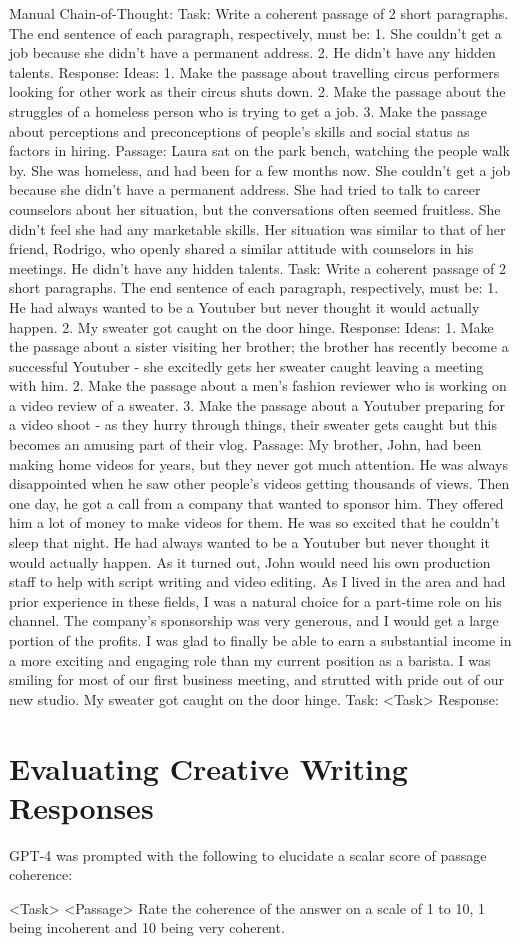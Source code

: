 \documentclass[11pt]{article}
\begin{document}
Manual Chain-of-Thought:
Task: Write a coherent passage of 2 short paragraphs. The end sentence of each paragraph, respectively, must be: 1. She couldn't get a job because she didn't have a permanent address. 2. He didn't have any hidden talents.
Response: 
Ideas:
1. Make the passage about travelling circus performers looking for other work as their circus shuts down.
2. Make the passage about the struggles of a homeless person who is trying to get a job. 
3. Make the passage about perceptions and preconceptions of people's skills and social status as factors in hiring.
Passage: 
Laura sat on the park bench, watching the people walk by. She was homeless, and had been for a few months now. She couldn't get a job because she didn't have a permanent address.
She had tried to talk to career counselors about her situation, but the conversations often seemed fruitless. She didn't feel she had any marketable skills. Her situation was similar to that of her friend, Rodrigo, who openly shared a similar attitude with counselors in his meetings. He didn't have any hidden talents.
Task: Write a coherent passage of 2 short paragraphs. The end sentence of each paragraph, respectively, must be: 1. He had always wanted to be a Youtuber but never thought it would actually happen. 2. My sweater got caught on the door hinge.
Response:
Ideas:
1. Make the passage about a sister visiting her brother; the brother has recently become a successful Youtuber - she excitedly gets her sweater caught leaving a meeting with him.
2. Make the passage about a men's fashion reviewer who is working on a video review of a sweater.
3. Make the passage about a Youtuber preparing for a video shoot - as they hurry through things, their sweater gets caught but this becomes an amusing part of their vlog.
Passage:
My brother, John, had been making home videos for years, but they never got much attention. He was always disappointed when he saw other people's videos getting thousands of views. Then one day, he got a call from a company that wanted to sponsor him. They offered him a lot of money to make videos for them. He was so excited that he couldn't sleep that night. He had always wanted to be a Youtuber but never thought it would actually happen.
As it turned out, John would need his own production staff to help with script writing and video editing. As I lived in the area and had prior experience in these fields, I was a natural choice for a part-time role on his channel. The company's sponsorship was very generous, and I would get a large portion of the profits. I was glad to finally be able to earn a substantial income in a more exciting and engaging role than my current position as a barista. I was smiling for most of our first business meeting, and strutted with pride out of our new studio. My sweater got caught on the door hinge.
Task: <Task>
Response:

\section{Evaluating Creative Writing Responses}

GPT-4 was prompted with the following to elucidate a scalar score of passage coherence:

<Task>
<Passage>
Rate the coherence of the answer on a scale of 1 to 10, 1 being incoherent and 10 being very coherent.
\end{document}
